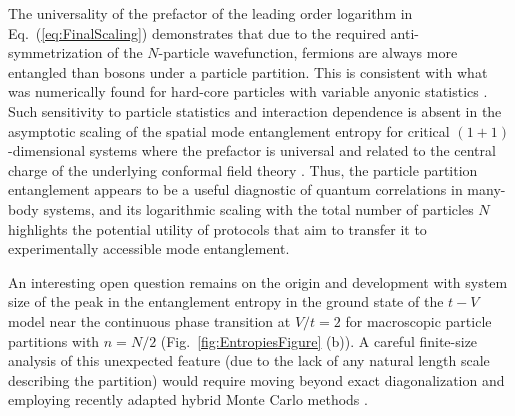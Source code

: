 The universality of the prefactor of the leading order logarithm in
Eq.~(\ref{eq:FinalScaling}) demonstrates that due to the required
anti-symmetrization of the $N$-particle wavefunction, fermions are always more
entangled than bosons under a particle partition. This is consistent with what
was numerically found for hard-core particles with variable anyonic statistics
\cite{Santachiara:2007il}.  Such sensitivity to particle statistics and
interaction dependence is absent in the asymptotic scaling of the spatial mode
entanglement entropy for critical $(1+1)$-dimensional systems where the
prefactor is universal and related to the central charge of the underlying
conformal field theory \cite{Calabrese:2004hl}.  Thus, the particle partition
entanglement appears to be a useful diagnostic of quantum correlations in
many-body systems, and its logarithmic scaling with the total number of
particles $N$ highlights the potential utility of protocols
\cite{Killoran:2014gu} that aim to transfer it to experimentally accessible
mode entanglement.

An interesting open question remains on the origin and development with system
size of the peak in the entanglement entropy in the ground state of
the $t-V$ model near the continuous phase transition at $V/t = 2$ for
macroscopic particle partitions with $n = N/2$
(Fig.~\ref{fig:EntropiesFigure} (b)). A careful finite-size analysis of this
unexpected feature (due to the lack of any natural length scale describing the
partition) would require moving beyond exact diagonalization 
and employing recently adapted hybrid Monte Carlo methods
\cite{Drut:2015fs,Drut:2016el,Porter:2016ft}. 
